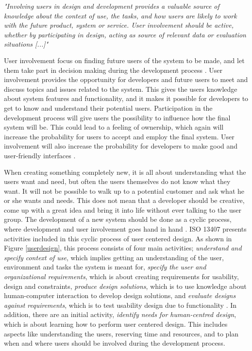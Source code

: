 \emph{"Involving users in design and development provides a valuable source of knowledge about the context of use, the tasks, and how users are likely to work with the future product, system or service. User involvement should be active, whether by participating in design, acting as source of relevant data or evaluation situations [...]"}

User involvement focus on finding future users of the system to be made, and let them take part in decision making during the development process \cite{bjerknes1995user}. User involvement provides the opportunity for developers and future users to meet and discuss topics and issues related to the system. This gives the users knowledge about system features and functionality, and it makes it possible for developers to get to know and understand their potential users. Participation in the development process will give users the possibility to influence how the final system will be. This could lead to a feeling of ownership, which again will increase the probability for users to accept and employ the final system. User involvement will also increase the probability for developers to make good and user-friendly interfaces \cite{infodesign} \cite{mmi}. 

When creating something completely new, it is all about understanding what the users want and need, but often the users themselves do not know what they want. It will not be possible to walk up to a potential customer and ask what he or she wants and needs. This does not mean that a developer should be creative, come up with a great idea and bring it into life without ever talking to the user group. The development of a new system should be done as a cyclic process, where development and user involvement goes hand in hand \cite{mmi}. ISO 13407 presents activities included in this cyclic process of user centered design. As shown in Figure \ref{userdesign}, this process consists of four main activities; \emph{understand and specify context of use}, which implies getting an understanding of the user, environment and tasks the system is meant for, \emph{specify the user and organizational requirements}, which is about creating requirements for usability, design and constraints, \emph{produce design solutions}, which is to use knowledge about human-computer interaction to develop design solutions, and \emph{evaluate designs against requirements}, which is to test usability design due to functionality \cite{jokela2003standard}. In addition, there are an initial activity, \emph{identify needs for human-centred design}, which is about learning how to perform user centered design. This includes aspects like understanding the users, reserving time and resources, and to plan when and where users should be involved during the development process. 

